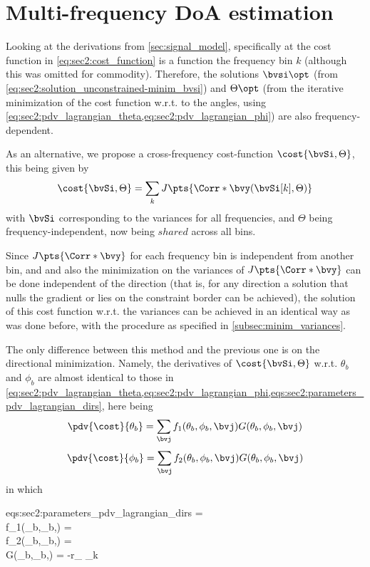 \section{Multi-frequency DoA estimation}

Looking at the derivations from \cref{sec:signal_model}, specifically at the cost function in \cref{eq:sec2:cost_function} is a function the frequency bin $k$ (although this was omitted for commodity). Therefore, the solutions $\bvsi\opt$ (from \cref{eq:sec2:solution_unconstrained-minim_bvsi}) and $\Theta\opt$ (from the iterative minimization of the cost function w.r.t. to the angles, using \cref{eq:sec2:pdv_lagrangian_theta,eq:sec2:pdv_lagrangian_phi}) are also frequency-dependent. 

As an alternative, we propose a cross-frequency cost-function $\cost{\bvSi,\Theta}$, this being given by
\begin{equation}
	\cost{\bvSi,\Theta} = \sum_{k} J\pts{\Corr*{\bvy}(\bvSi[k], \Theta)}
\end{equation}
with $\bvSi$ corresponding to the variances for all frequencies, and $\Theta$ being frequency-independent, now being $shared$ across all bins.

Since $J\pts{\Corr*{\bvy}}$ for each frequency bin is independent from another bin, and and also the minimization on the variances of $J\pts{\Corr*{\bvy}}$ can be done independent of the direction (that is, for any direction a solution that nulls the gradient or lies on the constraint border can be achieved), the solution of this cost function w.r.t. the variances can be achieved in an identical way as was done before, with the procedure as specified in \cref{subsec:minim_variances}.

The only difference between this method and the previous one is on the directional minimization. Namely, the derivatives of $\cost{\bvSi,\Theta}$ w.r.t. $\theta_b$ and $\phi_b$ are almost identical to those in \cref{eq:sec2:pdv_lagrangian_theta,eq:sec2:pdv_lagrangian_phi,eqs:sec2:parameters_pdv_lagrangian_dirs}, here being
\begin{equation}
	\label{eq:secA:pdv_lagrangian_theta}
	\pdv{\cost}{\theta_b} = \sum_{\bvj} f_1(\theta_b,\phi_b,\bvj) G(\theta_b,\phi_b,\bvj)
\end{equation}
\begin{equation}
	\label{eq:secA:pdv_lagrangian_phi}
	\pdv{\cost}{\phi_b}   = \sum_{\bvj} f_2(\theta_b,\phi_b,\bvj) G(\theta_b,\phi_b,\bvj)
\end{equation}
in which
\begin{subgather}{eqs:sec2:parameters_pdv_lagrangian_dirs}
	\alpha =  \\
	f_1(\theta_b,\phi_b,\bvj) = \sin{} \cos{} \\
	f_2(\theta_b,\phi_b,\bvj) = \cos{} \sin{} \\
	G(\theta_b,\phi_b,\bvj) = -r_{\bvj} \sum_{k} \alpha[k] 
\end{subgather}


